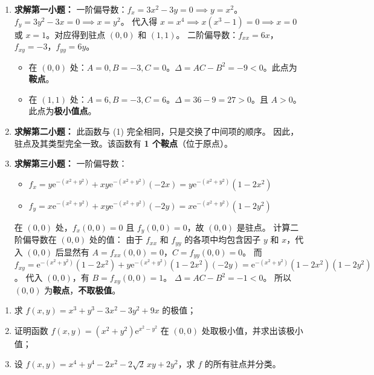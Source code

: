 \documentclass[lang=cn,11pt]{elegantbook}
\begin{document}
\begin{solution}
\begin{enumerate}
  \item[(1)] \textbf{求解第一小题：}
  一阶偏导数：$f_x = 3x^2-3y = 0 \implies y=x^2$。$f_y = 3y^2-3x = 0 \implies x=y^2$。
  代入得 $x = x^4 \implies x(x^3-1)=0 \implies x=0$ 或 $x=1$。对应得到驻点 $(0,0)$ 和 $(1,1)$。
  二阶偏导数：$f_{xx} = 6x$，$f_{xy} = -3$，$f_{yy} = 6y$。
  \begin{itemize}
    \item 在 $(0,0)$ 处：$A=0, B=-3, C=0$。$\Delta = AC - B^2 = -9 < 0$。此点为\textbf{鞍点}。
    \item 在 $(1,1)$ 处：$A=6, B=-3, C=6$。$\Delta = 36 - 9 = 27 > 0$。且 $A > 0$。此点为\textbf{极小值点}。
  \end{itemize}

  \item[(2)] \textbf{求解第二小题：}
  此函数与 (1) 完全相同，只是交换了中间项的顺序。
  因此，驻点及其类型完全一致。该函数有 \textbf{1 个鞍点}（位于原点）。

  \item[(3)] \textbf{求解第三小题：}
  一阶偏导数：
  \begin{itemize}
    \item $f_x = y\mathrm{e}^{-(x^2+y^2)} + xy\mathrm{e}^{-(x^2+y^2)}(-2x) = y\mathrm{e}^{-(x^2+y^2)}(1-2x^2)$
    \item $f_y = x\mathrm{e}^{-(x^2+y^2)} + xy\mathrm{e}^{-(x^2+y^2)}(-2y) = x\mathrm{e}^{-(x^2+y^2)}(1-2y^2)$
  \end{itemize}
  在 $(0,0)$ 处，$f_x(0,0)=0$ 且 $f_y(0,0)=0$，故 $(0,0)$ 是驻点。
  计算二阶偏导数在 $(0,0)$ 处的值：
  由于 $f_{xx}$ 和 $f_{yy}$ 的各项中均包含因子 $y$ 和 $x$，代入 $(0,0)$ 后显然有 $A = f_{xx}(0,0) = 0$，$C = f_{yy}(0,0) = 0$。
  而 $f_{xy} = \mathrm{e}^{-(x^2+y^2)}(1-2x^2) + y\mathrm{e}^{-(x^2+y^2)}(1-2x^2)(-2y) = \mathrm{e}^{-(x^2+y^2)}(1-2x^2)(1-2y^2)$。
  代入 $(0,0)$，有 $B = f_{xy}(0,0) = 1$。
  $\Delta = AC - B^2 = -1 < 0$。
  所以 $(0,0)$ 为\textbf{鞍点}，\textbf{不取极值}。
\end{enumerate}
\end{solution}

\begin{exercise}
\begin{enumerate}
  \item[(1)] 求 $f(x,y)=x^3+y^3-3x^2-3y^2+9x$ 的极值；
  \item[(2)] 证明函数 $f(x,y)=(x^2+y^2)\mathrm{e}^{x^2-y^2}$ 在 $(0,0)$ 处取极小值，并求出该极小值；
  \item[(3)] 设 $f(x,y)=x^4+y^4-2x^2-2\sqrt2\,xy+2y^2$，求 $f$ 的所有驻点并分类。
\end{enumerate}
\end{exercise}
\end{document}
